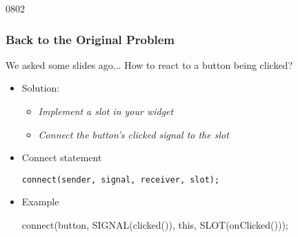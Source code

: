 \begin{slide}[fragile]{0802}\frametitle{Back to the Original Problem}
  \begin{block}{We asked some slides ago...}
    How to react to a button being clicked?
  \end{block}
\begin{itemize}
\item Solution:
  \begin{itemize}
  \item \emph{Implement a slot in your widget}
  \item \emph{Connect the button's clicked signal to the slot}
  \end{itemize}
\item Connect statement
\begin{lstlisting}
connect(sender, signal, receiver, slot);
\end{lstlisting}

\item Example
\begin{cpp}
connect(button, SIGNAL(clicked()), this, SLOT(onClicked()));
\end{cpp}
\end{itemize}
\end{slide}



